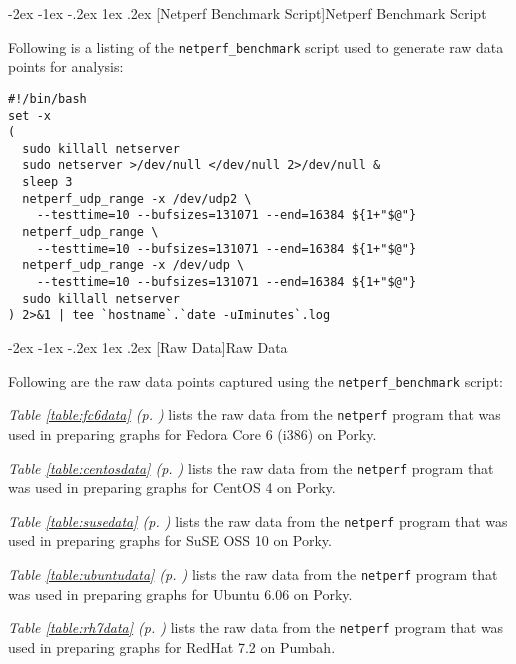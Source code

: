 \documentclass[letterpaper,final,notitlepage,twocolumn,10pt,twoside]{article}
\makeatletter
\let\large\normalsize
\let\normalsize\small
\let\small\footnotesize
\let\footnotesize\scriptsize
\let\scriptsize\tiny
\renewcommand\section{\@startsection {section}{1}{\z@}%
                                   {-2ex \@plus -1ex \@minus -.2ex}%
                                   {1ex \@plus .2ex}%
                                   {\normalfont\large\bfseries}}
\makeatother
\begin{document}
\FloatBarrier
{}


\clearpage
\begin{appendix}

\section[Netperf Benchmark Script]{Netperf Benchmark Script}
\label{section:script}

Following is a listing of the \texttt{netperf\_benchmark} script used to
generate raw data points for analysis:

\small
\begin{verbatim}
#!/bin/bash
set -x
(
  sudo killall netserver
  sudo netserver >/dev/null </dev/null 2>/dev/null &
  sleep 3
  netperf_udp_range -x /dev/udp2 \
    --testtime=10 --bufsizes=131071 --end=16384 ${1+"$@"}
  netperf_udp_range \
    --testtime=10 --bufsizes=131071 --end=16384 ${1+"$@"}
  netperf_udp_range -x /dev/udp \
    --testtime=10 --bufsizes=131071 --end=16384 ${1+"$@"}
  sudo killall netserver
) 2>&1 | tee `hostname`.`date -uIminutes`.log
\end{verbatim}

\section[Raw Data]{Raw Data}

Following are the raw data points captured using the
\texttt{netperf\_benchmark} script:

\textit{Table \ref{table:fc6data} (p.  \pageref{table:fc6data})} lists the raw
data from the \texttt{netperf} program that was used in preparing graphs for
Fedora Core 6 (i386) on Porky.

\textit{Table \ref{table:centosdata} (p. \pageref{table:centosdata})} lists
the raw data from the \texttt{netperf} program that was used in preparing
graphs for CentOS 4 on Porky.

\textit{Table \ref{table:susedata} (p. \pageref{table:susedata})} lists the
raw data from the \texttt{netperf} program that was used in preparing graphs
for SuSE OSS 10 on Porky.

\textit{Table \ref{table:ubuntudata} (p. \pageref{table:ubuntudata})} lists
the raw data from the \texttt{netperf} program that was used in preparing
graphs for Ubuntu 6.06 on Porky.

\textit{Table \ref{table:rh7data} (p. \pageref{table:rh7data})} lists the raw
data from the \texttt{netperf} program that was used in preparing graphs for
RedHat 7.2 on Pumbah.


\end{appendix}
\end{document}
